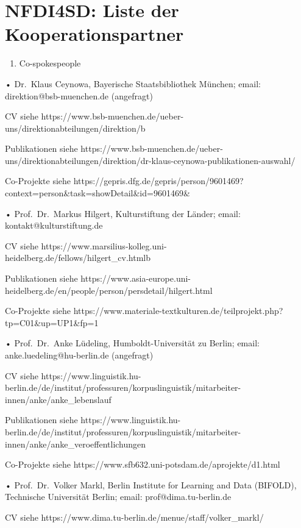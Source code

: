 \documentclass[
]{article}
\author{}
\date{}
\providecommand{\tightlist}{%
  \setlength{\itemsep}{0pt}\setlength{\parskip}{0pt}}
\begin{document}
\hypertarget{nfdi4sd-liste-der-kooperationspartner}{%
\section{NFDI4SD: Liste der
Kooperationspartner}\label{nfdi4sd-liste-der-kooperationspartner}}


\begin{enumerate}
\def\labelenumi{\arabic{enumi}.}
\setcounter{enumi}{1}
\tightlist
\item
  Co-spokespeople
\end{enumerate}

• Dr.~Klaus Ceynowa, Bayerische Staatsbibliothek München; email:
direktion@bsb-muenchen.de (angefragt)

CV siehe
https://www.bsb-muenchen.de/ueber-uns/direktionabteilungen/direktion/b

Publikationen siehe
https://www.bsb-muenchen.de/ueber-uns/direktionabteilungen/direktion/dr-klaus-ceynowa-publikationen-auswahl/

Co-Projekte siehe
https://gepris.dfg.de/gepris/person/9601469?context=person\&task=showDetail\&id=9601469\&

• Prof.~Dr.~Markus Hilgert, Kulturstiftung der Länder; email:
kontakt@kulturstiftung.de

CV siehe
https://www.marsilius-kolleg.uni-heidelberg.de/fellows/hilgert\_cv.htmlb

Publikationen siehe
https://www.asia-europe.uni-heidelberg.de/en/people/person/persdetail/hilgert.html

Co-Projekte siehe
https://www.materiale-textkulturen.de/teilprojekt.php?tp=C01\&up=UP1\&fp=1

• Prof.~Dr.~Anke Lüdeling, Humboldt-Universität zu Berlin; email:
anke.luedeling@hu-berlin.de (angefragt)

CV siehe
https://www.linguistik.hu-berlin.de/de/institut/professuren/korpuslinguistik/mitarbeiter-innen/anke/anke\_lebenslauf

Publikationen siehe
https://www.linguistik.hu-berlin.de/de/institut/professuren/korpuslinguistik/mitarbeiter-innen/anke/anke\_veroeffentlichungen

Co-Projekte siehe https://www.sfb632.uni-potsdam.de/aprojekte/d1.html

• Prof.~Dr.~Volker Markl, Berlin Institute for Learning and Data
(BIFOLD), Technische Universität Berlin; email: prof@dima.tu-berlin.de

CV siehe https://www.dima.tu-berlin.de/menue/staff/volker\_markl/
\end{document}
